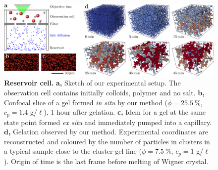 \documentclass[footinbib,amsmath,amssymb,superscriptaddress,twocolumn]{revtex4}
\begin{document}

\begin{figure}
	\includegraphics{figs/cell_vs_cap2.pdf}
	\caption{\textbf{Reservoir cell.} \textbf{a,} Sketch of our experimental setup. The observation cell contains initially colloids, polymer and no salt. \textbf{b,} Confocal slice of a gel formed \textit{in situ} by our method ($\phi=25.5~\%$, $c_p=1.4$ g/$\ell$), 1 hour after gelation. \textbf{c,} Idem for a gel at the same state point formed \textit{ex situ} and immediately pumped into a capillary. \textbf{d,} Gelation observed by our method. Experimental coordinates are reconstructed and coloured by the number of particles in clusters in a typical sample close to the cluster-gel line ($\phi=7.5~\%$, $c_p=1$ g/$\ell$). Origin of time is the last frame before melting of Wigner crystal.
	}
	\label{fig:cell_vs_cap}
\end{figure}
\end{document}
